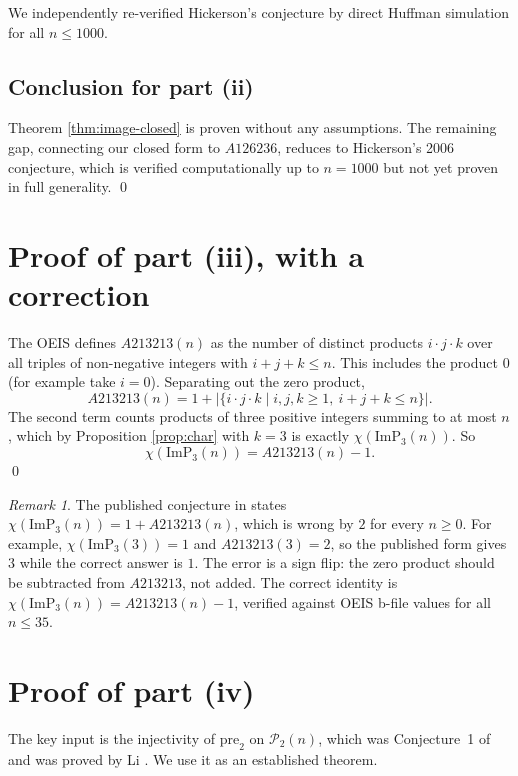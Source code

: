 \documentclass[11pt]{article}
\theoremstyle{remark}
\newtheorem{remark}[theorem]{Remark}
\begin{document}
We independently re-verified Hickerson's conjecture by direct Huffman simulation for all $n \leq 1000$.

\subsection*{Conclusion for part (ii)}

Theorem \ref{thm:image-closed} is proven without any assumptions. The remaining gap, connecting our closed form to $A126236$, reduces to Hickerson's 2006 conjecture, which is verified computationally up to $n = 1000$ but not yet proven in full generality. \qed

\section{Proof of part (iii), with a correction}

The OEIS defines $A213213(n)$ as the number of distinct products $i \cdot j \cdot k$ over all triples of non-negative integers with $i + j + k \leq n$. This includes the product $0$ (for example take $i = 0$). Separating out the zero product,
\[
A213213(n) = 1 + \bigl|\{ i \cdot j \cdot k \mid i, j, k \geq 1,\ i + j + k \leq n \}\bigr|.
\]
The second term counts products of three positive integers summing to at most $n$, which by Proposition \ref{prop:char} with $k = 3$ is exactly $\chi(\mathrm{ImP}_3(n))$. So
\[
\chi(\mathrm{ImP}_3(n)) = A213213(n) - 1.
\]
\qed

\begin{remark}
The published conjecture in \cite{BBMS} states $\chi(\mathrm{ImP}_3(n)) = 1 + A213213(n)$, which is wrong by $2$ for every $n \geq 0$. For example, $\chi(\mathrm{ImP}_3(3)) = 1$ and $A213213(3) = 2$, so the published form gives $3$ while the correct answer is $1$. The error is a sign flip: the zero product should be subtracted from $A213213$, not added. The correct identity is $\chi(\mathrm{ImP}_3(n)) = A213213(n) - 1$, verified against OEIS b-file values for all $n \leq 35$.
\end{remark}

\section{Proof of part (iv)}

The key input is the injectivity of $\mathrm{pre}_2$ on $\mathcal{P}_2(n)$, which was Conjecture~1 of \cite{BBMS} and was proved by Li \cite{Li}. We use it as an established theorem.
\end{document}
